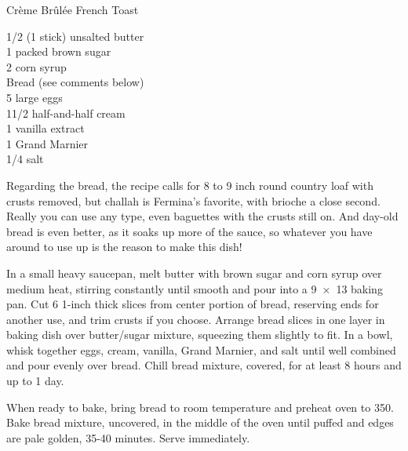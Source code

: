 \begin{entry}{Cr\`eme Br\^ul\'ee French Toast}

\begin{open}

\end{open}
\begin{ingredients}
    \SI{1/2}{\cup} (1 stick) unsalted butter \\
    \SI{1}{\cup} packed brown sugar \\
    \SI{2}{\tblspoon} corn syrup \\
    Bread (see comments below)\\
    5 large eggs\\
    1\SI{1/2}{\cup} half-and-half cream \\
    \SI{1}{\teaspoon} vanilla extract \\
    \SI{1}{\teaspoon} Grand Marnier \\
    \SI{1/4}{\teaspoon} salt
\end{ingredients}
Regarding the bread, the recipe calls for 8 to 9 inch round country loaf with
crusts removed, but challah is Fermina's favorite, with brioche a close
second. Really you can use any type, even baguettes with the crusts still
on. And day-old bread is even better, as it soaks up more of the sauce, so
whatever you have around to use up is the reason to make this dish!

In a small heavy saucepan, melt butter with brown sugar and corn syrup over
medium heat, stirring constantly until smooth and pour into a \SI{9x13}{\inch}
baking pan. Cut 6 1-inch thick slices from center portion of bread, reserving
ends for another use, and trim crusts if you choose. Arrange bread slices in
one layer in baking dish over butter/sugar mixture, squeezing them slightly to
fit. In a bowl, whisk together eggs, cream, vanilla, Grand Marnier, and salt
until well combined and pour evenly over bread. Chill bread mixture, covered,
for at least 8 hours and up to 1 day.

When ready to bake, bring bread to room temperature and preheat oven to
\SI{350}{\degreeF}. Bake bread mixture, uncovered, in the middle of the oven
until puffed and edges are pale golden, 35-40 minutes. Serve immediately.
\end{entry}


